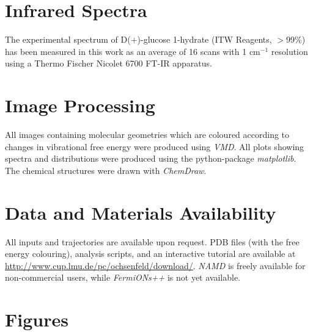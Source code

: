 \documentclass[12pt, english, letter]{article}
\begin{document}
	
	\section{Infrared Spectra}
	
	The experimental spectrum of D(+)-glucose 1-hydrate (ITW Reagents, $>$99\%) has been measured in this work as an average of 16 scans with 1 cm$^{-1}$ resolution using a Thermo Fischer Nicolet 6700 FT-IR apparatus.
	
	\section{Image Processing}
	
	All images containing molecular geometries which are coloured according to changes in vibrational free energy were produced using \emph{VMD}\autocite{HUMP96}. All plots showing spectra and distributions were produced using the python-package \emph{matplotlib}\autocite{Hunter2007}. The chemical structures were drawn with \emph{ChemDraw}.
	
	\section{Data and Materials Availability}
	All inputs and trajectories are available upon request. PDB files (with the free energy colouring), analysis scripts, and an interactive tutorial are available at \url{http://www.cup.lmu.de/pc/ochsenfeld/download/}. \emph{NAMD} is freely available for non-commercial users, while \emph{FermiONs++} is not yet available. 
	
	\newpage
	
	\section{Figures}
	
\end{document}
